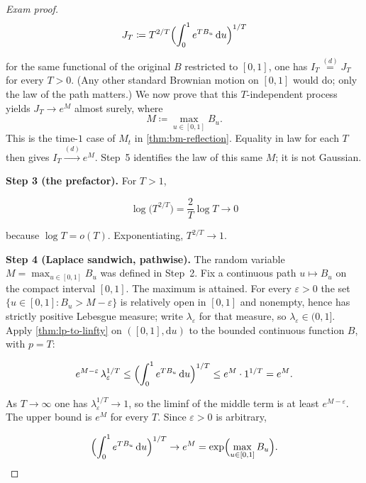 \documentclass[11pt,a4paper]{article}
\begin{document}
\begin{proof}[Exam proof]
\[
J_T
\coloneqq
T^{2/T}
\Bigl(\int_0^1 e^{T B_u}\,\mathrm{d}u\Bigr)^{1/T}
\]

for the same functional of the original \(B\) restricted to \([0,1]\), one has \(I_T\stackrel{(d)}{=}J_T\) for every \(T>0\). (Any other standard Brownian motion on \([0,1]\) would do; only the law of the path matters.) We now prove that this \(T\)-independent process yields \(J_T\to e^{M}\) almost surely, where
\[
M
\coloneqq
\max_{u\in[0,1]} B_u.
\]
This is the time-\(1\) case of \(M_t\) in \cref{thm:bm-reflection}. Equality in law for each \(T\) then gives \(I_T\xrightarrow{(d)}e^{M}\). Step~5 identifies the law of this same \(M\); it is not Gaussian.

\textbf{Step 3 (the prefactor).}
For \(T>1\),

\[
\log\bigl(T^{2/T}\bigr)
=
\frac{2}{T}\log T
\to 0
\]

because \(\log T=o(T)\). Exponentiating, \(T^{2/T}\to 1\).

\textbf{Step 4 (Laplace sandwich, pathwise).}
The random variable \(M=\max_{u\in[0,1]}B_u\) was defined in Step~2. Fix a continuous path \(u\mapsto B_u\) on the compact interval \([0,1]\). The maximum is attained. For every \(\varepsilon>0\) the set \(\{u\in[0,1]: B_u>M-\varepsilon\}\) is relatively open in \([0,1]\) and nonempty, hence has strictly positive Lebesgue measure; write \(\lambda_{\varepsilon}\) for that measure, so \(\lambda_{\varepsilon}\in(0,1]\). Apply \cref{thm:lp-to-linfty} on \(([0,1],\mathrm{d}u)\) to the bounded continuous function \(B\), with \(p=T\):

\[
e^{M-\varepsilon}\,\lambda_{\varepsilon}^{1/T}
\le
\Bigl(\int_0^1 e^{T B_u}\,\mathrm{d}u\Bigr)^{1/T}
\le
e^{M}\cdot 1^{1/T}
=
e^{M}.
\]

As \(T\to\infty\) one has \(\lambda_{\varepsilon}^{1/T}\to 1\), so the liminf of the middle term is at least \(e^{M-\varepsilon}\). The upper bound is \(e^{M}\) for every \(T\). Since \(\varepsilon>0\) is arbitrary,

\[
\Bigl(\int_0^1 e^{T B_u}\,\mathrm{d}u\Bigr)^{1/T}
\to
e^{M}
=
\exp\Bigl(\max_{u\in[0,1]} B_u\Bigr).
\]


\end{proof}
\end{document}
